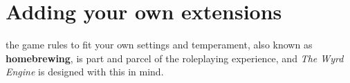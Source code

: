 \chapter{Adding your own extensions}

 the game rules to fit your own settings and temperament, also known as \textbf{homebrewing}, is part and parcel of the roleplaying experience, and \emph{The Wyrd Engine} is designed with this in mind.

